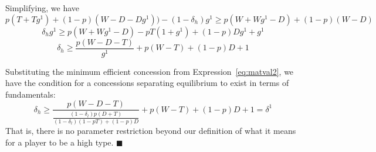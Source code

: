 \documentclass[12pt, letterpaper]{article}
\newcommand{\be}{\begin{equation}}
\newcommand{\ee}{\end{equation}}
\newcommand{\de}{\delta}
\begin{document}
{Simplifying, we have
$$p(T+Tg^1) + (1-p)(W-D-Dg^1)) - (1-\de_h)g^1 \geq p(W+Wg^1-D) + (1-p)(W-D)$$
$$\de_h g^1 \geq p(W+Wg^1-D) - pT(1+g^1) + (1-p)Dg^1 + g^1$$
$$\de_h \geq \frac{p(W-D-T)}{g^1} + p (W-T) + (1-p)D + 1$$

Substituting the minimum efficient concession from Expression~\ref{eq:matval2}, we have the condition for a concessions separating equilibrium to exist in terms of fundamentals:
\be
	\de_h \geq \frac{p(W-D-T)}{\frac{\left(1-\de_l\right)p\left(D +	 T\right)}{\left(1-\de_l\right)\left(1 - pT \right) + (1-p) D}} + p (W-T) + (1-p)D + 1 = \de^1
\ee
That is, there is no parameter restriction beyond our definition of what it means for a player to be a high type. \hfill $\blacksquare$

}
\end{document}
